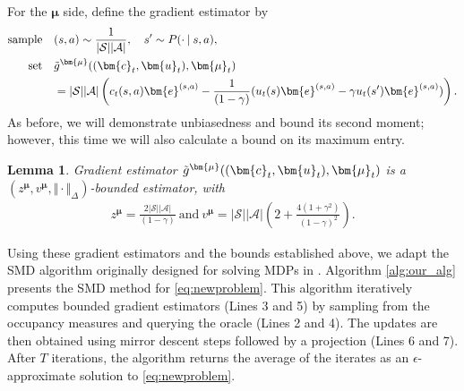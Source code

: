 \documentclass[10pt]{article} %
\newtheorem{lemma}{Lemma}
\def\Ac{\ensuremath{\mathcal{A}}}
\def\vc{{\bm{c}}}
\def\ve{{\bm{e}}}
\def\vu{{\bm{u}}}
\def\vmu{{\bm{\mu}}}
\def\evc{{c}}
\def\evu{{u}}
\newcommand{\St}{\mathcal{S}}
\begin{document}
For the $\vmu$ side, define the gradient estimator by
\begin{align}\label{eq:mu_grad}\nonumber
    \text{sample} \quad &(s, a) \sim \frac{1}{|\St||\Ac|},\quad s^\prime \sim P(\cdot\:|\:s,a), \nonumber\\
    \text{set} \quad &\Tilde{g}^{\vmu}((\vc_t,\vu_t),\vmu_t)\\\nonumber
& = |\St||\Ac|\left(\evc_t(s,a)\ve^{(s,a)} - \frac{1}{(1-\gamma)}(\evu_t(s)\ve^{(s,a)}-\gamma\evu_t(s')\ve^{(s,a)})\right).
\end{align}
As before, we will demonstrate unbiasedness and bound its second moment; however, this time we will also calculate a bound on its maximum entry.
\begin{lemma} \label{lemma:mu_grad}
    Gradient estimator $\Tilde{g}^{\vmu}((\vc_t,\vu_t),\vmu_t)$ is a $(z^{\vmu}, v^{\vmu}, \Vert \cdot \Vert_{\Delta})$-bounded estimator, with 
    \begin{align*}
        z^{\vmu} =   \frac{2|\St||\Ac|}{(1-\gamma)} \: \text{and} \: v^{\vmu} = |\St||\Ac|\left(2 + \frac{4(1+\gamma^2)}{(1-\gamma)^2}\right).
    \end{align*}
\end{lemma}

Using these gradient estimators and the bounds established above, we adapt the SMD algorithm originally designed for solving MDPs in \cite{Jin2020}.  Algorithm \ref{alg:our_alg} presents the SMD method for \eqref{eq:newproblem}. This algorithm iteratively computes bounded gradient estimators (Lines 3 and 5) by sampling from the occupancy measures and querying the oracle (Lines 2 and 4). The updates are then obtained using mirror descent steps followed by a projection (Lines 6 and 7). After \( T \) iterations, the algorithm returns the average of the iterates as an $\epsilon$-approximate solution to \eqref{eq:newproblem}.
\end{document}
